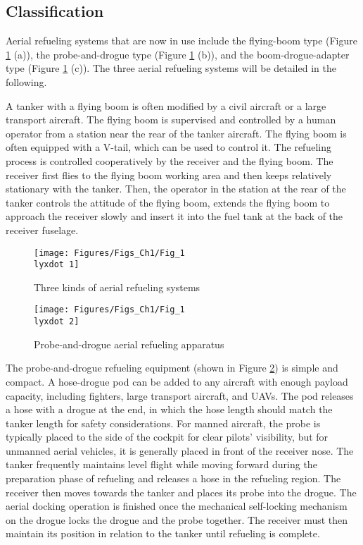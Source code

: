 \subsection{Classification}

Aerial refueling systems that are now in use include the flying-boom
type (Figure \ref{Fig_1.1} (a)), the probe-and-drogue type (Figure
\ref{Fig_1.1} (b)), and the boom-drogue-adapter type (Figure \ref{Fig_1.1}
(c)). The three aerial refueling systems will be detailed in the following.

A tanker with a flying boom is often modified by a civil aircraft
or a large transport aircraft. The flying boom is supervised and controlled
by a human operator from a station near the rear of the tanker aircraft.
The flying boom is often equipped with a V-tail, which can be used
to control it. The refueling process is controlled cooperatively by
the receiver and the flying boom. The receiver first flies to the
flying boom working area and then keeps relatively stationary with
the tanker. Then, the operator in the station at the rear of the tanker
controls the attitude of the flying boom, extends the flying boom
to approach the receiver slowly and insert it into the fuel tank at
the back of the receiver fuselage.

\begin{figure}
\begin{centering}
\texttt{[image: Figures/Figs\_Ch1/Fig\_1\\lyxdot 1]}
\par\end{centering}
\caption{Three kinds of aerial refueling systems}

\centering{}\label{Fig_1.1}
\end{figure}

\begin{figure}
\begin{centering}
\texttt{[image: Figures/Figs\_Ch1/Fig\_1\\lyxdot 2]}
\par\end{centering}
\caption{Probe-and-drogue aerial refueling apparatus}

\centering{}\label{Fig_1.2}
\end{figure}

The probe-and-drogue refueling equipment (shown in Figure \ref{Fig_1.2})
is simple and compact. A hose-drogue pod can be added to any aircraft
with enough payload capacity, including fighters, large transport
aircraft, and UAVs. The pod releases a hose with a drogue at the end,
in which the hose length should match the tanker length for safety
considerations. For manned aircraft, the probe is typically placed
to the side of the cockpit for clear pilots' visibility, but for unmanned
aerial vehicles, it is generally placed in front of the receiver nose.
The tanker frequently maintains level flight while moving forward
during the preparation phase of refueling and releases a hose in the
refueling region. The receiver then moves towards the tanker and places
its probe into the drogue. The aerial docking operation is finished
once the mechanical self-locking mechanism on the drogue locks the
drogue and the probe together. The receiver must then maintain its
position in relation to the tanker until refueling is complete.

